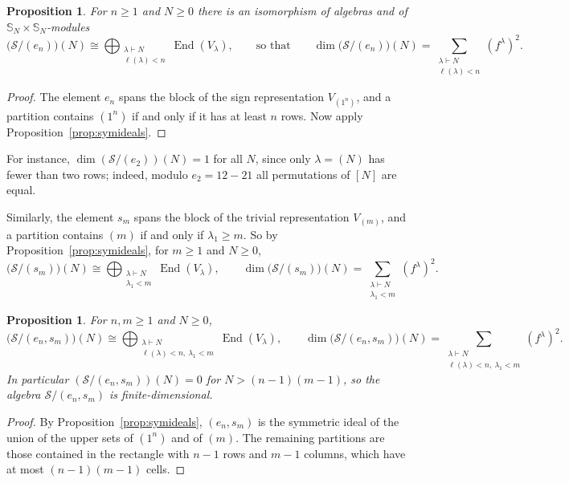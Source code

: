 \documentclass[11pt]{amsart}
\newtheorem{proposition}[theorem]{Proposition}
\theoremstyle{definition}
\theoremstyle{remark}
\newcommand{\bS}{\mathbb{S}}
\newcommand{\cS}{\mathscr{S}}
\newcommand{\End}{\operatorname{End}}
\begin{document}
\begin{proposition}\label{prop:rep}
For $n\ge1$ and $N\ge0$ there is an isomorphism of algebras and of $\bS_N\times\bS_N$-modules
\[
\bigl(\cS/(e_n)\bigr)(N)\cong\bigoplus_{\substack{\lambda\vdash N\\ \ell(\lambda)<n}}\End(V_\lambda),\qquad\text{so that}\qquad
\dim\bigl(\cS/(e_n)\bigr)(N)=\sum_{\substack{\lambda\vdash N\\ \ell(\lambda)<n}}(f^\lambda)^2 .
\]
\end{proposition}

\begin{proof}
The element $e_n$ spans the block of the sign representation $V_{(1^n)}$, and a partition contains $(1^n)$ if and only if it has at least $n$ rows. Now apply Proposition~\ref{prop:symideals}.
\end{proof}

For instance, $\dim(\cS/(e_2))(N)=1$ for all $N$, since only $\lambda=(N)$ has fewer than two rows; indeed, modulo $e_2=12-21$ all permutations of $[N]$ are equal.

Similarly, the element $s_m$ spans the block of the trivial representation $V_{(m)}$, and a partition contains $(m)$ if and only if $\lambda_1\ge m$. So by Proposition~\ref{prop:symideals}, for $m\ge1$ and $N\ge0$,
\begin{equation}\label{eq:sm}
\bigl(\cS/(s_m)\bigr)(N)\cong\bigoplus_{\substack{\lambda\vdash N\\ \lambda_1<m}}\End(V_\lambda),\qquad
\dim\bigl(\cS/(s_m)\bigr)(N)=\sum_{\substack{\lambda\vdash N\\ \lambda_1<m}}(f^\lambda)^2 .
\end{equation}

\begin{proposition}\label{prop:ensm}
For $n,m\ge1$ and $N\ge0$,
\[
\bigl(\cS/(e_n,s_m)\bigr)(N)\cong\bigoplus_{\substack{\lambda\vdash N\\ \ell(\lambda)<n,\ \lambda_1<m}}\End(V_\lambda),\qquad
\dim\bigl(\cS/(e_n,s_m)\bigr)(N)=\sum_{\substack{\lambda\vdash N\\ \ell(\lambda)<n,\ \lambda_1<m}}(f^\lambda)^2 .
\]
In particular $(\cS/(e_n,s_m))(N)=0$ for $N>(n-1)(m-1)$, so the algebra $\cS/(e_n,s_m)$ is finite-dimensional.
\end{proposition}

\begin{proof}
By Proposition~\ref{prop:symideals}, $(e_n,s_m)$ is the symmetric ideal of the union of the upper sets of $(1^n)$ and of $(m)$. The remaining partitions are those contained in the rectangle with $n-1$ rows and $m-1$ columns, which have at most $(n-1)(m-1)$ cells.
\end{proof}
\end{document}
